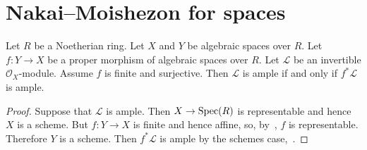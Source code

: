 \section{Nakai--Moishezon for spaces}

\begin{lemma}
\label{lemma-surjective-finite-morphism-ample}
Let $R$ be a Noetherian ring.
Let $X$ and $Y$ be algebraic spaces over $R$.
Let $f : Y \to X$ be a proper morphism of algebraic spaces over $R$.
Let $\mathcal{L}$ be an invertible $\mathcal{O}_X$-module.
Assume $f$ is finite and surjective.
Then $\mathcal{L}$ is ample if and only if $f^*\mathcal{L}$ is ample.
\end{lemma}

\begin{proof}
Suppose that $\mathcal{L}$ is ample.
Then $X \to \mathop{\rm Spec}(R)$ is representable and hence $X$ is a scheme.
But $f : Y \to X$ is finite and hence affine, so,
by~, $f$ is representable.
Therefore $Y$ is a scheme.
Then $f^*\mathcal{L}$ is ample by the schemes case,~.


\end{proof}
